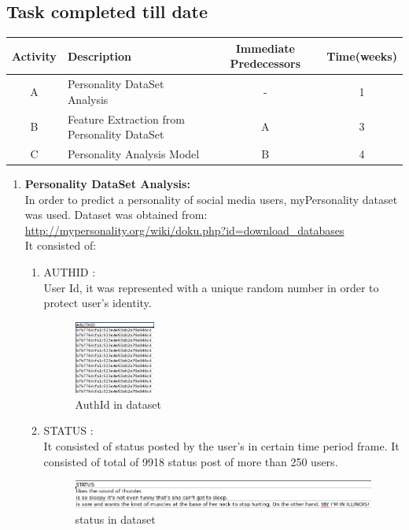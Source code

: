 \documentclass[a4paper, 12pt, onepage]{article}
\begin{document}
      \subsection{Task completed till date}
	\begin{center}
		\begin{tabular}{|c|l|c|c|}
			\hline
				Activity & Description & Immediate Predecessors&Time(weeks)\\
			\hline
			A&Personality DataSet Analysis&-&1\\
			\hline
			B&Feature Extraction from Personality DataSet&A&3\\
			\hline
			C&Personality Analysis Model&B&4\\
			\hline
		\end{tabular}
	\end{center}
	\begin{enumerate}
		\item \textbf{Personality DataSet Analysis:}\\
		In order to predict a personality of social media users, myPersonality dataset was used. Dataset was obtained from: \url{http://mypersonality.org/wiki/doku.php?id=download_databases} \\
		It consisted of:
		\begin{enumerate}
		\item AUTHID : \\ 
			User Id, it was represented with a unique random number in order to protect user's identity.
      \begin{figure}[h!]
	      \centering
	      \includegraphics[width=100px]{userid.png}
		\caption{AuthId in dataset}
	\end{figure}
		\item STATUS : \\ 
			It consisted of status posted by the user's in certain time period frame. It consisted of total of 9918 status post of more than 250 users.
      \begin{figure}[h!]
	      \includegraphics[width=450px]{status.png}
		\caption{status in dataset}

\end{figure}
\end{enumerate}
\end{enumerate}
\end{document}
